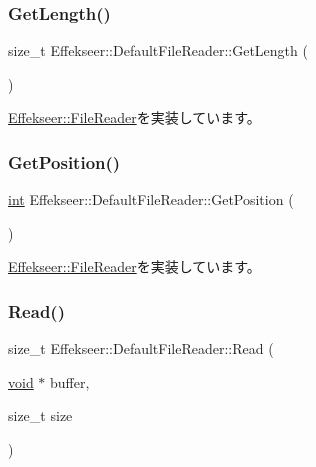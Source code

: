 \subsubsection{\texorpdfstring{Get\+Length()}{GetLength()}}
{\footnotesize\ttfamily size\+\_\+t Effekseer\+::\+Default\+File\+Reader\+::\+Get\+Length (\begin{DoxyParamCaption}{ }\end{DoxyParamCaption})\hspace{0.3cm}{\ttfamily [virtual]}}



\mbox{\hyperlink{class_effekseer_1_1_file_reader_ae802d02a06437baa0ed74f1927617924}{Effekseer\+::\+File\+Reader}}を実装しています。

\mbox{\label{class_effekseer_1_1_default_file_reader_a86001f21782b7cb40a5e0ca4ee155aca}} 
\subsubsection{\texorpdfstring{Get\+Position()}{GetPosition()}}
{\footnotesize\ttfamily \mbox{\hyperlink{namespace_effekseer_ace0abf7c2e6947e519ebe8b54cbcc30a}{int}} Effekseer\+::\+Default\+File\+Reader\+::\+Get\+Position (\begin{DoxyParamCaption}{ }\end{DoxyParamCaption})\hspace{0.3cm}{\ttfamily [virtual]}}



\mbox{\hyperlink{class_effekseer_1_1_file_reader_ad69aa533374ee6661938c7a81495b6d7}{Effekseer\+::\+File\+Reader}}を実装しています。

\mbox{\label{class_effekseer_1_1_default_file_reader_ae00fd8b1031e13bd5a43d74f03d7ed79}} 
\subsubsection{\texorpdfstring{Read()}{Read()}}
{\footnotesize\ttfamily size\+\_\+t Effekseer\+::\+Default\+File\+Reader\+::\+Read (\begin{DoxyParamCaption}\item[{\mbox{\hyperlink{namespace_effekseer_ab34c4088e512200cf4c2716f168deb56}{void}} $\ast$}]{buffer,  }\item[{size\+\_\+t}]{size }\end{DoxyParamCaption})\hspace{0.3cm}{\ttfamily [virtual]}}



